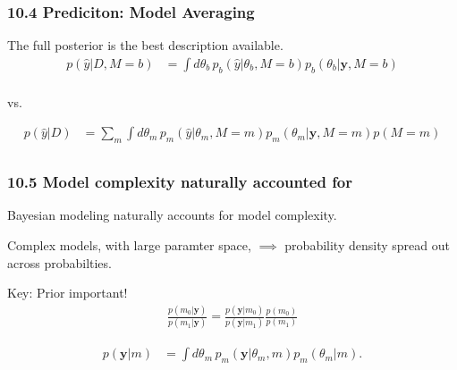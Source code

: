 \documentclass[usenames,dvipsnames,table]{beamer}
\begin{document}
\begin{frame}
\frametitle{10.4 Prediciton: Model Averaging}

The full posterior is the best description available.
\begin{align*}
p(\hat{y}|D, M=b)
    &= \int\! d\theta_b\, p_b(\hat{y}|\theta_b, M=b)p_b(\theta_b|\mathbf{y}, M=b)\\
\end{align*}%
\begin{center}vs.\end{center}%
\begin{align*}
p(\hat{y}|D)
    &= \sum_m \int\! d\theta_m\, p_m(\hat{y}|\theta_m, M=m)p_m(\theta_m|\mathbf{y}, M=m) p(M=m)\\
\end{align*}
\end{frame}





\begin{frame}
\frametitle{10.5 Model complexity naturally accounted for}
Bayesian modeling naturally accounts for model complexity.

\vspace{1em}
Complex models, with large paramter space, $\implies$ probability density spread out across probabilties.

\vspace{1em}
Key: Prior important!
\begin{align*}
\frac{p(m_0|\mathbf{y})}
     {p(m_1|\mathbf{y})}
    =  \frac{p(\mathbf{y}|m_0)}
             {p(\mathbf{y}|m_1)}
        \frac{p(m_0)}
             {p(m_1)}
\end{align*}

\begin{align*}
p(\mathbf{y}|m)
    &= \int\! d\theta_{m}\,
             p_{m}(\mathbf{y}|\theta_{m},m) p_{m}(\theta_{m}|m). \tag{10.4}
\end{align*}

\begin{align*}
\end{align*}
\end{frame}







\end{document}
